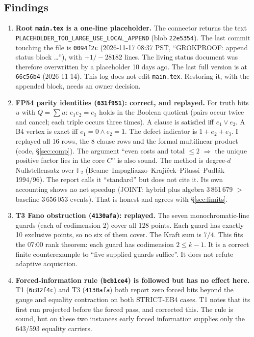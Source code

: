 \documentclass[11pt]{article}
\theoremstyle{definition}
\newcommand{\F}{\mathbb{F}_2}
\begin{document}
\subsection*{Findings}
\begin{enumerate}
\item \textbf{Root \texttt{main.tex} is a one-line placeholder.} The connector returns the text \texttt{PLACEHOLDER\_TOO\_LARGE\_USE\_LOCAL\_APPEND} (blob \texttt{22e5354}). The last commit touching the file is \texttt{0094f2c} (2026-11-17 08:37 PST, ``GROKPROOF: append status block \ldots''), with $+1/-28182$ lines. The living status document was therefore overwritten by a placeholder 10 days ago. The last full version is at \texttt{66c56b4} (2026-11-14). This log does not edit \texttt{main.tex}. Restoring it, with the appended block, needs an owner decision.
\item \textbf{FP54 parity identities (\texttt{631f951}): correct, and replayed.} For truth bits $u$ with $Q=\sum u$: $e_1e_2=e_3$ holds in the Boolean quotient (pairs occur twice and cancel; each triple occurs three times). A clause is satisfied iff $e_1\lor e_2$. A B4 vertex is exact iff $e_1=0\land e_2=1$. The defect indicator is $1+e_2+e_3$. I replayed all 16 rows, the 8 clause rows and the formal multilinear product (code, \S\ref{sec:comp}). The argument ``even costs and total $\le2$ $\Rightarrow$ the unique positive factor lies in the core $C$'' is also sound. The method is degree-$d$ Nullstellensatz over $\F$ (Beame--Impagliazzo--Kraj\'{\i}\v{c}ek--Pitassi--Pudl\'ak 1994/96). The report calls it ``standard'' but does not cite it. Its own accounting shows no net speedup (JOINT: hybrid plus algebra 3\,861\,679 $>$ baseline 3\,656\,053 events). That is honest and agrees with \S\ref{sec:limits}.
\item \textbf{T3 Fano obstruction (\texttt{4130afa}): replayed.} The seven monochromatic-line guards (each of codimension 2) cover all 128 points. Each guard has exactly 10 exclusive points, so no six of them cover. The Kraft sum is $7/4$. This fits the 07:00 rank theorem: each guard has codimension $2\le k-1$. It is a correct finite counterexample to ``five supplied guards suffice''. It does not refute adaptive acquisition.
\item \textbf{Forced-information rule (\texttt{bcb1ce4}) is followed but has no effect here.} T1 (\texttt{6c82f4c}) and T3 (\texttt{4130afa}) both report zero forced bits beyond the gauge and equality contraction on both STRICT-EB4 cases. T1 notes that its first run projected before the forced pass, and corrected this. The rule is sound, but on these two instances early forced information supplies only the 643/593 equality carriers.

\end{enumerate}
\end{document}
